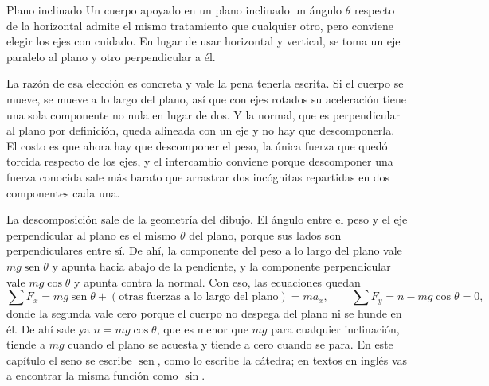 \documentclass[11pt,openany]{book}
\newcommand{\sen}{\operatorname{sen}}
\begin{document}
\begin{bloque}{Plano inclinado}
Un cuerpo apoyado en un plano inclinado un ángulo $\theta$ respecto de la horizontal admite el mismo tratamiento que cualquier otro, pero conviene elegir los ejes con cuidado. En lugar de usar horizontal y vertical, se toma un eje paralelo al plano y otro perpendicular a él.

La razón de esa elección es concreta y vale la pena tenerla escrita. Si el cuerpo se mueve, se mueve a lo largo del plano, así que con ejes rotados su aceleración tiene una sola componente no nula en lugar de dos. Y la normal, que es perpendicular al plano por definición, queda alineada con un eje y no hay que descomponerla. El costo es que ahora hay que descomponer el peso, la única fuerza que quedó torcida respecto de los ejes, y el intercambio conviene porque descomponer una fuerza conocida sale más barato que arrastrar dos incógnitas repartidas en dos componentes cada una.

\begin{center}
\end{center}

La descomposición sale de la geometría del dibujo. El ángulo entre el peso y el eje perpendicular al plano es el mismo $\theta$ del plano, porque sus lados son perpendiculares entre sí. De ahí, la componente del peso a lo largo del plano vale $mg\sen\theta$ y apunta hacia abajo de la pendiente, y la componente perpendicular vale $mg\cos\theta$ y apunta contra la normal. Con eso, las ecuaciones quedan
\[
\sum F_x = mg\sen\theta + (\text{otras fuerzas a lo largo del plano}) = ma_x,
\qquad
\sum F_y = n - mg\cos\theta = 0,
\]
donde la segunda vale cero porque el cuerpo no despega del plano ni se hunde en él. De ahí sale ya $n = mg\cos\theta$, que es menor que $mg$ para cualquier inclinación, tiende a $mg$ cuando el plano se acuesta y tiende a cero cuando se para. En este capítulo el seno se escribe $\sen$, como lo escribe la cátedra; en textos en inglés vas a encontrar la misma función como $\sin$.


\end{bloque}
\end{document}
